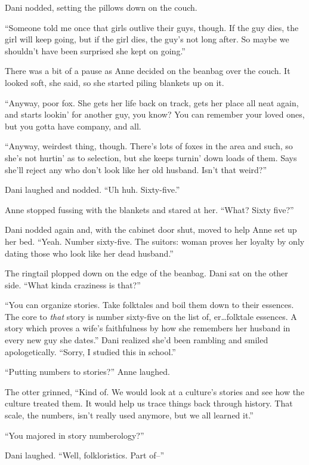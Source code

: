 Dani nodded, setting the pillows down on the couch.

``Someone told me once that girls outlive their guys, though. If the guy dies, the girl will keep going, but if the girl dies, the guy's not long after. So maybe we shouldn't have been surprised she kept on going.''

There was a bit of a pause as Anne decided on the beanbag over the couch. It looked soft, she said, so she started piling blankets up on it.

``Anyway, poor fox. She gets her life back on track, gets her place all neat again, and starts lookin' for another guy, you know? You can remember your loved ones, but you gotta have company, and all.

``Anyway, weirdest thing, though. There's lots of foxes in the area and such, so she's not hurtin' as to selection, but she keeps turnin' down loads of them. Says she'll reject any who don't look like her old husband. Isn't that weird?''

Dani laughed and nodded. ``Uh huh. Sixty-five.''

Anne stopped fussing with the blankets and stared at her. ``What? Sixty five?''

Dani nodded again and, with the cabinet door shut, moved to help Anne set up her bed. ``Yeah. Number sixty-five. The suitors: woman proves her loyalty by only dating those who look like her dead husband.''

The ringtail plopped down on the edge of the beanbag. Dani sat on the other side. ``What kinda craziness is that?''

``You can organize stories. Take folktales and boil them down to their essences. The core to \emph{that} story is number sixty-five on the list of, er\ldots{}folktale essences. A story which proves a wife's faithfulness by how she remembers her husband in every new guy she dates.'' Dani realized she'd been rambling and smiled apologetically. ``Sorry, I studied this in school.''

``Putting numbers to stories?'' Anne laughed.

The otter grinned, ``Kind of. We would look at a culture's stories and see how the culture treated them. It would help us trace things back through history. That scale, the numbers, isn't really used anymore, but we all learned it.''

``You majored in story numberology?''

Dani laughed. ``Well, folkloristics. Part of--''

